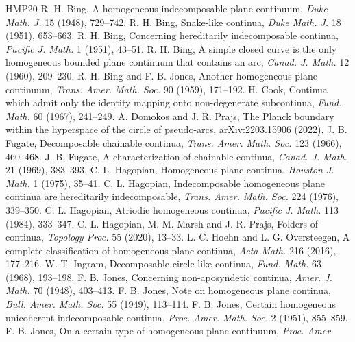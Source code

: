 \documentclass[11pt]{article}
\begin{document}
\begin{thebibliography}{HMP20}\small
{} R. H. Bing, A homogeneous indecomposable plane continuum, \emph{Duke Math. J.}
  15 (1948), 729--742.
 R. H. Bing, Snake-like continua, \emph{Duke Math. J.} 18 (1951), 653--663.
 R. H. Bing, Concerning hereditarily indecomposable continua, \emph{Pacific J.
  Math.} 1 (1951), 43--51.
 R. H. Bing, A simple closed curve is the only homogeneous bounded plane continuum
  that contains an arc, \emph{Canad. J. Math.} 12 (1960), 209--230.
 R. H. Bing and F. B. Jones, Another homogeneous plane continuum, \emph{Trans.
  Amer. Math. Soc.} 90 (1959), 171--192.
 H. Cook, Continua which admit only the identity mapping onto non-degenerate
  subcontinua, \emph{Fund. Math.} 60 (1967), 241--249.
 A. Domokos and J. R. Prajs, The Planck boundary within the hyperspace of the
  circle of pseudo-arcs, arXiv:2203.15906 (2022).
 J. B. Fugate, Decomposable chainable continua, \emph{Trans. Amer. Math. Soc.}
  123 (1966), 460--468.
 J. B. Fugate, A characterization of chainable continua, \emph{Canad. J. Math.} 21
  (1969), 383--393.
 C. L. Hagopian, Homogeneous plane continua, \emph{Houston J. Math.} 1 (1975),
  35--41.
 C. L. Hagopian, Indecomposable homogeneous plane continua are hereditarily
  indecomposable, \emph{Trans. Amer. Math. Soc.} 224 (1976), 339--350.
 C. L. Hagopian, Atriodic homogeneous continua, \emph{Pacific J. Math.} 113
  (1984), 333--347.
 C. L. Hagopian, M. M. Marsh and J. R. Prajs, Folders of continua,
  \emph{Topology Proc.} 55 (2020), 13--33.
 L. C. Hoehn and L. G. Oversteegen, A complete classification of homogeneous
  plane continua, \emph{Acta Math.} 216 (2016), 177--216.
 W. T. Ingram, Decomposable circle-like continua, \emph{Fund. Math.} 63 (1968),
  193--198.
 F. B. Jones, Concerning non-aposyndetic continua, \emph{Amer. J. Math.} 70
  (1948), 403--413.
 F. B. Jones, Note on homogeneous plane continua, \emph{Bull. Amer. Math. Soc.} 55
  (1949), 113--114.
 F. B. Jones, Certain homogeneous unicoherent indecomposable continua,
  \emph{Proc. Amer. Math. Soc.} 2 (1951), 855--859.
 F. B. Jones, On a certain type of homogeneous plane continuum, \emph{Proc. Amer.
}
\end{thebibliography}
\end{document}
